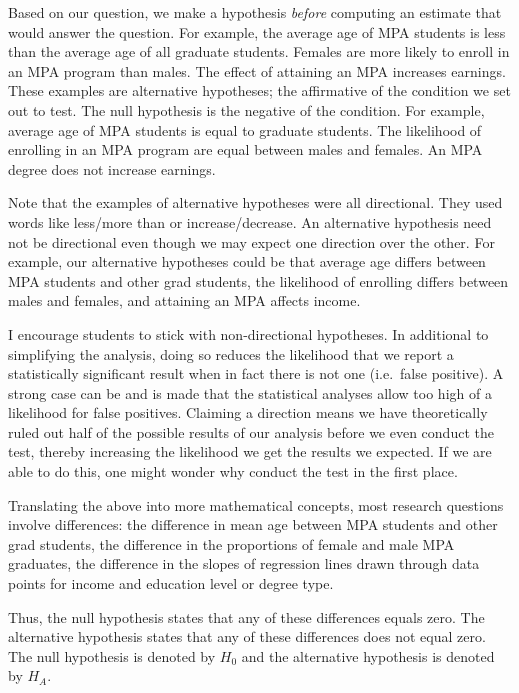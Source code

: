 \documentclass[
]{book}
\begin{document}
Based on our question, we make a hypothesis \emph{before} computing an estimate that would answer the question. For example, the average age of MPA students is less than the average age of all graduate students. Females are more likely to enroll in an MPA program than males. The effect of attaining an MPA increases earnings. These examples are alternative hypotheses; the affirmative of the condition we set out to test. The null hypothesis is the negative of the condition. For example, average age of MPA students is equal to graduate students. The likelihood of enrolling in an MPA program are equal between males and females. An MPA degree does not increase earnings.

Note that the examples of alternative hypotheses were all directional. They used words like less/more than or increase/decrease. An alternative hypothesis need not be directional even though we may expect one direction over the other. For example, our alternative hypotheses could be that average age differs between MPA students and other grad students, the likelihood of enrolling differs between males and females, and attaining an MPA affects income.

I encourage students to stick with non-directional hypotheses. In additional to simplifying the analysis, doing so reduces the likelihood that we report a statistically significant result when in fact there is not one (i.e.~false positive). A strong case can be and is made that the statistical analyses allow too high of a likelihood for false positives. Claiming a direction means we have theoretically ruled out half of the possible results of our analysis before we even conduct the test, thereby increasing the likelihood we get the results we expected. If we are able to do this, one might wonder why conduct the test in the first place.

Translating the above into more mathematical concepts, most research questions involve differences: the difference in mean age between MPA students and other grad students, the difference in the proportions of female and male MPA graduates, the difference in the slopes of regression lines drawn through data points for income and education level or degree type.

Thus, the null hypothesis states that any of these differences equals zero. The alternative hypothesis states that any of these differences does not equal zero. The null hypothesis is denoted by \(H_0\) and the alternative hypothesis is denoted by \(H_A\).
\end{document}
